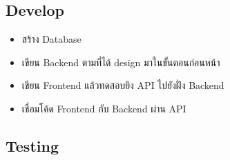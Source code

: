 \subsection{Develop}
\begin{itemize}
  \item สร้าง Database
  \item เขียน Backend ตามที่ได้ design มาในขั้นตอนก่อนหน้า
  \item เขียน Frontend แล้วทดสอบยิง API ไปยังฝั่ง Backend
  \item เชื่อมโค้ด Frontend กับ Backend ผ่าน API
\end{itemize}

\subsection{Testing}
